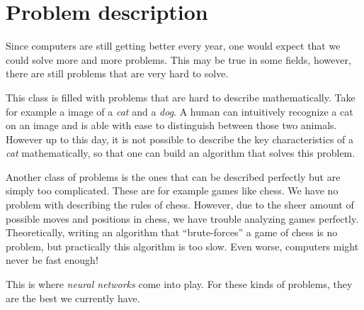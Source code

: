 \section{Problem description}
\label{sec:problem-description}

Since computers are still getting better every year, one would expect that we could solve more and more problems.
This may be true in some fields, however, there are still problems that are very hard to solve.

This class is filled with problems that are hard to describe mathematically.
Take for example a image of a \emph{cat} and a \emph{dog}.
A human can intuitively recognize a cat on an image and is able with ease to distinguish between those two animals.
However up to this day, it is not possible to describe the key characteristics of a \emph{cat} mathematically,
so that one can build an algorithm that solves this problem.

Another class of problems is the ones that can be described perfectly but are simply too complicated.
These are for example games like chess.
We have no problem with describing the rules of chess.
However, due to the sheer amount of possible moves and positions in chess, we have trouble analyzing games perfectly.
Theoretically, writing an algorithm that \enquote{brute-forces} a game of chess is no problem, but practically this algorithm is too slow.
Even worse, computers might never be fast enough!

This is where \emph{neural networks} come into play.
For these kinds of problems, they are the best we currently have.